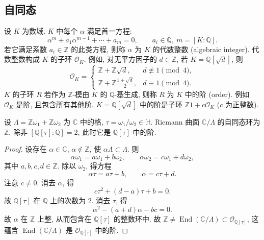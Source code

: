 \subsection*{自同态}

设 $K$ 为数域. $K$ 中每个 $\alpha$ 满足首一方程:
\begin{equation} \label{eq:22}
\alpha^m + a_1\alpha^{m-1} + \cdots + a_m = 0, \qquad a_i\in\mathbb{Q}, \ m = [K:\mathbb{Q}].
\tag{22}
\end{equation}
若它满足系数 $a_i\in\mathbb{Z}$ 的此类方程, 则称 $\alpha$ 为 $K$ 的代数整数 (algebraic integer). 代数整数构成 $K$ 的子环 $\mathcal{O}_K$. 例如, 对无平方因子的 $d\in\mathbb{Z}$, 若 $K = \mathbb{Q}[\sqrt{d}]$, 则
\[
\mathcal{O}_K = \begin{cases} \mathbb{Z} + \mathbb{Z}\sqrt{d}, & d\not\equiv 1\pmod{4},\\ \mathbb{Z} + \mathbb{Z}\frac{1+\sqrt{d}}{2}, & d\equiv 1\pmod{4}. \end{cases}
\]
$K$ 的子环 $R$ 若作为 $\mathbb{Z}$-模由 $K$ 的 $\mathbb{Q}$-基生成, 则称 $R$ 为 $K$ 中的阶 (order). 例如 $\mathcal{O}_K$ 是阶, 且包含所有其他阶. $K = \mathbb{Q}[\sqrt{d}]$ 中的阶是子环 $\mathbb{Z}1 + c\mathcal{O}_K$ ($c$ 为正整数).

\begin{proposition} \label{thm:3.3.17} 
设 $\Lambda = \mathbb{Z}\omega_1 + \mathbb{Z}\omega_2$ 为 $\mathbb{C}$ 中的格, $\tau = \omega_1/\omega_2\in\mathbb{H}$. Riemann 曲面 $\mathbb{C}/\Lambda$ 的自同态环为 $\mathbb{Z}$, 除非 $[\mathbb{Q}[\tau]:\mathbb{Q}] = 2$, 此时它是 $\mathbb{Q}[\tau]$ 中的阶.
\end{proposition}

\begin{proof}
设存在 $\alpha\in\mathbb{C}$, $\alpha\notin\mathbb{Z}$, 使 $\alpha\Lambda\subset\Lambda$. 则
\[
\alpha\omega_1 = a\omega_1 + b\omega_2, \qquad
\alpha\omega_2 = c\omega_1 + d\omega_2,
\]
其中 $a, b, c, d\in\mathbb{Z}$. 除以 $\omega_2$, 得方程
\[
\alpha\tau = a\tau + b, \qquad \alpha = c\tau + d.
\]
注意 $c\neq 0$. 消去 $\alpha$, 得
\[
c\tau^2 + (d-a)\tau + b = 0.
\]
故 $\mathbb{Q}[\tau]$ 在 $\mathbb{Q}$ 上的次数为 $2$. 消去 $\tau$, 得
\[
\alpha^2 - (a+d)\alpha - bc = 0.
\]
故 $\alpha$ 在 $\mathbb{Z}$ 上整, 从而包含在 $\mathbb{Q}[\tau]$ 的整数环中. 故 $\mathbb{Z}\neq\operatorname{End}(\mathbb{C}/\Lambda)\subset\mathcal{O}_{\mathbb{Q}[\tau]}$, 这蕴含 $\operatorname{End}(\mathbb{C}/\Lambda)$ 是 $\mathcal{O}_{\mathbb{Q}[\tau]}$ 中的阶.
\end{proof}

